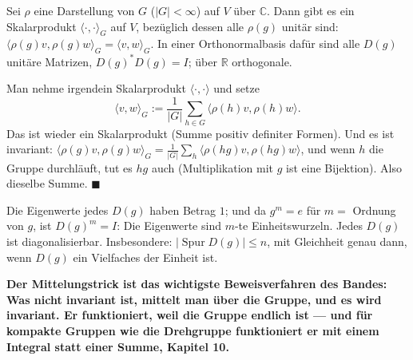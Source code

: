 \begin{merksatz}
Sei $\rho$ eine Darstellung von $G$ ($|G| < \infty$) auf $V$ über $\mathbb C$. Dann gibt es ein Skalarprodukt $\langle\cdot, \cdot\rangle_G$ auf $V$, bezüglich dessen alle $\rho(g)$ unitär sind: $\langle\rho(g)v, \rho(g)w\rangle_G = \langle v, w\rangle_G$. In einer Orthonormalbasis dafür sind alle $D(g)$ unitäre Matrizen, $D(g)^{*}D(g) = I$; über $\mathbb R$ orthogonale.

Man nehme irgendein Skalarprodukt $\langle\cdot, \cdot\rangle$ und setze
\[ \langle v, w\rangle_G := \frac{1}{|G|}\sum_{h\in G}\langle\rho(h)v, \rho(h)w\rangle . \]
Das ist wieder ein Skalarprodukt (Summe positiv definiter Formen). Und es ist invariant: $\langle\rho(g)v, \rho(g)w\rangle_G = \frac1{|G|}\sum_h\langle\rho(hg)v, \rho(hg)w\rangle$, und wenn $h$ die Gruppe durchläuft, tut es $hg$ auch (Multiplikation mit $g$ ist eine Bijektion). Also dieselbe Summe. $\blacksquare$

Die Eigenwerte jedes $D(g)$ haben Betrag $1$; und da $g^{m} = e$ für $m = $ Ordnung von $g$, ist $D(g)^{m} = I$: Die Eigenwerte sind $m$-te Einheitswurzeln. Jedes $D(g)$ ist diagonalisierbar. Insbesondere: $|\operatorname{Spur}D(g)|\le n$, mit Gleichheit genau dann, wenn $D(g)$ ein Vielfaches der Einheit ist.

\begin{center}
\begin{minipage}{0.9\textwidth}
\textbf{Der Mittelungstrick ist das wichtigste Beweisverfahren des Bandes: Was nicht invariant ist, mittelt man über die Gruppe, und es wird invariant. Er funktioniert, weil die Gruppe endlich ist --- und für kompakte Gruppen wie die Drehgruppe funktioniert er mit einem Integral statt einer Summe, Kapitel 10.}
\end{minipage}
\end{center}

\begin{center}
\begin{minipage}{0.88\textwidth}
\end{minipage}
\end{center}
\end{merksatz}

